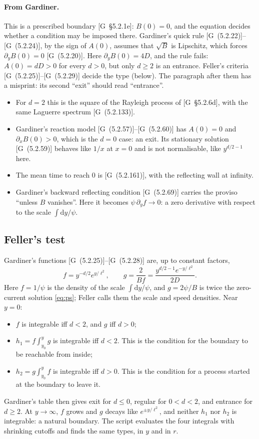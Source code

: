 \documentclass[11pt]{article}
\numberwithin{equation}{section}
\newcommand{\dd}{\mathrm{d}}
\newcommand{\G}[1]{[G~(#1)]}
\newcommand{\Gs}[1]{[G~\S#1]}
\begin{document}
\paragraph{From Gardiner.} This is a prescribed boundary \Gs{5.2.1e}: $B(0)=0$, and the equation decides whether a
condition may be imposed there. Gardiner's quick rule \G{5.2.22}--\G{5.2.24}, by the sign of $A(0)$, assumes that
$\sqrt B$ is Lipschitz, which forces $\partial_yB(0)=0$ \G{5.2.20}. Here $\partial_yB(0)=4D$, and the rule fails:
$A(0)=dD>0$ for every $d>0$, but only $d\ge2$ is an entrance. Feller's criteria \G{5.2.25}--\G{5.2.29} decide the
type (below). The paragraph after them has a misprint: its second ``exit'' should read ``entrance''.
\begin{itemize}
  \item For $d=2$ this is the square of the Rayleigh process of \Gs{5.2.6d}, with the same Laguerre spectrum
        \G{5.2.133}.
  \item Gardiner's reaction model \G{5.2.57}--\G{5.2.60} has $A(0)=0$ and $\partial_xB(0)>0$, which is the $d=0$ case:
        an exit. Its stationary solution \G{5.2.59} behaves like $1/x$ at $x=0$ and is not normalisable, like
        $y^{d/2-1}$ here.
  \item The mean time to reach $0$ is \G{5.2.161}, with the reflecting wall at infinity.
  \item Gardiner's backward reflecting condition \G{5.2.69} carries the proviso ``unless $B$ vanishes''. Here it
        becomes $\psi\,\partial_yf\to0$: a zero derivative with respect to the scale $\int\dd y/\psi$.
\end{itemize}

\subsection{Feller's test}
\label{sec:feller-test}

Gardiner's functions \G{5.2.25}--\G{5.2.28} are, up to constant factors,
\begin{equation}
  f=y^{-d/2}e^{y/\ell^2},\qquad g=\frac{2}{Bf}=\frac{y^{d/2-1}e^{-y/\ell^2}}{2D}.
\end{equation}
Here $f=1/\psi$ is the density of the scale $\int\dd y/\psi$, and $g=2\psi/B$ is twice the zero-current solution
\cref{eq:ps}; Feller calls them the scale and speed densities. Near $y=0$:
\begin{itemize}
  \item $f$ is integrable iff $d<2$, and $g$ iff $d>0$;
  \item $h_1=f\int_{y_0}^yg$ is integrable iff $d<2$. This is the condition for the boundary to be reachable from
        inside;
  \item $h_2=g\int_{y_0}^yf$ is integrable iff $d>0$. This is the condition for a process started at the boundary to
        leave it.
\end{itemize}
Gardiner's table then gives exit for $d\le0$, regular for $0<d<2$, and entrance for $d\ge2$. At $y\to\infty$, $f$
grows and $g$ decays like $e^{\pm y/\ell^2}$, and neither $h_1$ nor $h_2$ is integrable: a natural boundary. The
script evaluates the four integrals with shrinking cutoffs and finds the same types, in $y$ and in $r$.
\end{document}
